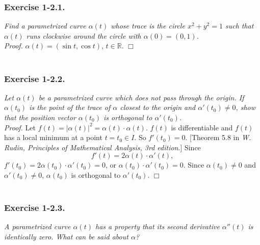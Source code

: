 \documentclass{article}
\begin{document}
\subsubsection*{Exercise 1-2.1.}
\emph{Find a parametrized curve $\alpha(t)$ whose trace is the circle
$x^2 + y^2 = 1$ such that $\alpha(t)$ runs clockwise around the circle with
$\alpha(0) = (0,1)$.} \\



\emph{Proof.}
$\alpha(t) = (\sin t, \cos t)$, $t \in \mathbb{R}$.
$\Box$ \\\\






\subsubsection*{Exercise 1-2.2.}
\emph{Let $\alpha(t)$ be a parametrized curve which does not pass through the origin.
If $\alpha(t_0)$ is the point of the trace of $\alpha$ closest to the origin
and $\alpha'(t_0) \neq 0$, show that the position vector $\alpha(t_0)$ is
orthogonal to $\alpha'(t_0)$.} \\



\emph{Proof.}
Let $f(t) = |\alpha(t)|^2 = \alpha(t) \cdot \alpha(t)$.
$f(t)$ is differentiable and $f(t)$ has a local minimum at a point $t = t_0 \in I$.
So $f'(t_0) = 0$. [Theorem 5.8 in \emph{W. Rudin, Principles of Mathematical Analysis, 3rd edition}.]
Since
$$f'(t) = 2 \alpha(t) \cdot \alpha'(t),$$
$f'(t_0) = 2 \alpha(t_0) \cdot \alpha'(t_0) = 0$,
or $\alpha(t_0) \cdot \alpha'(t_0) = 0$.
Since $\alpha(t_0) \neq 0$ and $\alpha'(t_0) \neq 0$,
$\alpha(t_0)$ is orthogonal to $\alpha'(t_0)$.
$\Box$ \\\\






\subsubsection*{Exercise 1-2.3.}
\emph{A parametrized curve $\alpha(t)$ has a property that its second derivative
$\alpha''(t)$ is identically zero.
What can be said about $\alpha$?} \\
\end{document}

